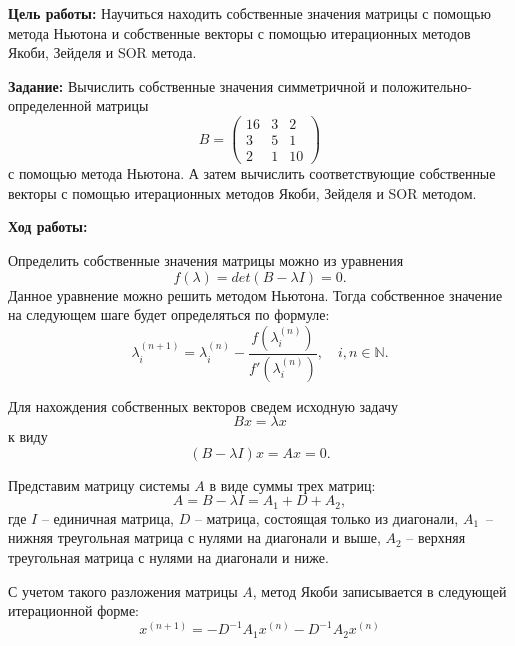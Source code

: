 \justifying
\textbf{Цель работы:}
Научиться находить собственные значения матрицы с помощью метода Ньютона и собственные векторы с помощью итерационных методов Якоби, Зейделя и SOR метода.

\textbf{Задание:}
Вычислить собственные значения симметричной и положительно-определенной матрицы
\begin{equation}\label{matrix}
    B = \begin{pmatrix}
    16 & 3 & 2 \\
    3 & 5 & 1 \\
    2 & 1 & 10 
    \end{pmatrix}
\end{equation}
с помощью метода Ньютона. А затем вычислить соответствующие собственные векторы с помощью итерационных методов Якоби, Зейделя и SOR методом.

\textbf{Ход работы:}

Определить собственные значения матрицы можно из уравнения
\begin{equation}\label{eival_equation}
    f(\lambda) = det(B - \lambda I) = 0.
\end{equation}
Данное уравнение можно решить методом Ньютона. Тогда собственное значение на следующем шаге будет определяться по формуле:
\begin{equation}\label{newton_method}
    \lambda_i^{(n + 1)} = \lambda_i^{(n)} - \frac{f(\lambda_i^{(n)})}{f'(\lambda_i^{(n)})}, \quad i, n \in \mathbb{N}.
\end{equation}

Для нахождения собственных векторов сведем исходную задачу
\begin{equation}
    B x = \lambda x
\end{equation}
к виду
\begin{equation}
    (B - \lambda I) x = A x = 0.
\end{equation}

Представим матрицу системы $A$ в виде суммы трех матриц:
\begin{equation}
    A = B - \lambda I = A_1 + D + A_2,
\end{equation}
где $I$ -- единичная матрица, $D$ -- матрица, состоящая только из диагонали, $A_1$~-- нижняя треугольная матрица с нулями на диагонали и выше, $A_2$ -- верхняя треугольная матрица с нулями на диагонали и ниже.

С учетом такого разложения матрицы $A$, метод Якоби записывается в следующей итерационной форме:
\begin{equation}\label{Jacobi}
    x^{(n+1)} = -D^{-1}A_1x^{(n)} -D^{-1}A_2x^{(n)}
\end{equation}

